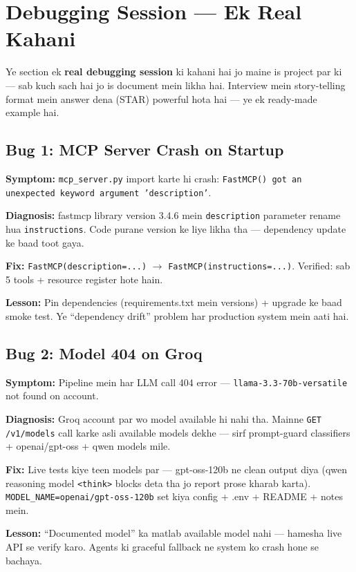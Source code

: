 \section{Debugging Session --- Ek Real Kahani}

\begin{storybox}
Ye section ek \textbf{real debugging session} ki kahani hai jo maine is project par ki --- sab kuch sach hai jo is document mein likha hai. Interview mein story-telling format mein answer dena (STAR) powerful hota hai --- ye ek ready-made example hai.
\end{storybox}

\subsection{Bug 1: MCP Server Crash on Startup}

\begin{interviewbox}
\textbf{Symptom:} \texttt{mcp\_server.py} import karte hi crash: \texttt{FastMCP() got an unexpected keyword argument 'description'}.

\textbf{Diagnosis:} fastmcp library version 3.4.6 mein \texttt{description} parameter rename hua \texttt{instructions}. Code purane version ke liye likha tha --- dependency update ke baad toot gaya.

\textbf{Fix:} \texttt{FastMCP(description=...)} $\rightarrow$ \texttt{FastMCP(instructions=...)}. Verified: sab 5 tools + resource register hote hain.

\textbf{Lesson:} Pin dependencies (requirements.txt mein versions) + upgrade ke baad smoke test. Ye ``dependency drift'' problem har production system mein aati hai.
\end{interviewbox}

\subsection{Bug 2: Model 404 on Groq}

\begin{interviewbox}
\textbf{Symptom:} Pipeline mein har LLM call 404 error --- \texttt{llama-3.3-70b-versatile} not found on account.

\textbf{Diagnosis:} Groq account par wo model available hi nahi tha. Mainne \texttt{GET /v1/models} call karke asli available models dekhe --- sirf prompt-guard classifiers + openai/gpt-oss + qwen models mile.

\textbf{Fix:} Live tests kiye teen models par --- gpt-oss-120b ne clean output diya (qwen reasoning model \texttt{<think>} blocks deta tha jo report prose kharab karta). \texttt{MODEL\_NAME=openai/gpt-oss-120b} set kiya config + .env + README + notes mein.

\textbf{Lesson:} ``Documented model'' ka matlab available model nahi --- hamesha live API se verify karo. Agents ki graceful fallback ne system ko crash hone se bachaya.
\end{interviewbox}

